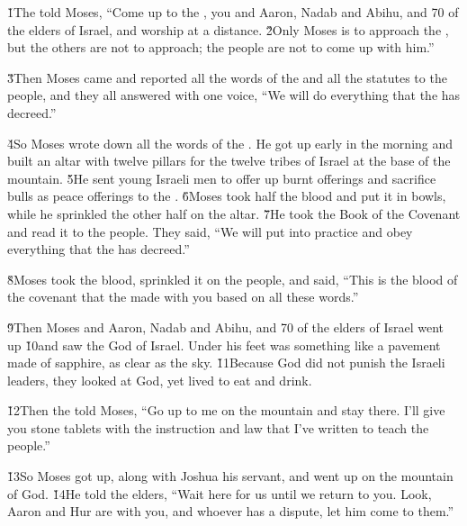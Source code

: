\v{1}The  told Moses, ``Come up to the , you and Aaron, Nadab and Abihu, and 70 of the elders of Israel, and worship at a distance. \v{2}Only Moses is to approach the , but the others are not to approach; the people are not to come up with him.''

\v{3}Then Moses came and reported all the words of the  and all the statutes to the people, and they all answered with one voice, ``We will do everything that the  has decreed.''

\v{4}So Moses wrote down all the words of the . He got up early in the morning and built an altar with twelve pillars for the twelve tribes of Israel at the base of the mountain. \v{5}He sent young Israeli men to offer up burnt offerings and sacrifice bulls as peace offerings to the . \v{6}Moses took half the blood and put it in bowls, while he sprinkled the other half on the altar. \v{7}He took the Book of the Covenant and read it to the people. They said, ``We will put into practice and obey everything that the  has decreed.''

\v{8}Moses took the blood, sprinkled it on the people, and said, ``This is the blood of the covenant that the  made with you based on all these words.''

\v{9}Then Moses and Aaron, Nadab and Abihu, and 70 of the elders of Israel went up \v{10}and saw the God of Israel. Under his feet was something like a pavement made of sapphire, as clear as the sky. \v{11}Because God did not punish the Israeli leaders, they looked at God, yet lived to eat and drink.

\v{12}Then the  told Moses, ``Go up to me on the mountain and stay there. I'll give you stone tablets with the instruction and law that I've written to teach the people.''

\v{13}So Moses got up, along with Joshua his servant, and went up on the mountain of God. \v{14}He told the elders, ``Wait here for us until we return to you. Look, Aaron and Hur are with you, and whoever has a dispute, let him come to them.''

